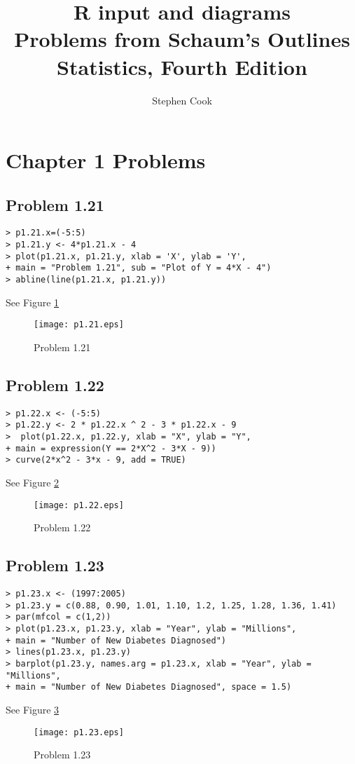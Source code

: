 \documentclass{article}
\title{R input and diagrams\\
Problems from Schaum's Outlines Statistics, Fourth Edition}
\author{Stephen Cook}
\begin{document}
\maketitle
\tableofcontents
\listoffigures

\newpage

\section{Chapter 1 Problems}
\subsection{Problem 1.21}
\begin{verbatim}
> p1.21.x=(-5:5)
> p1.21.y <- 4*p1.21.x - 4
> plot(p1.21.x, p1.21.y, xlab = 'X', ylab = 'Y', 
+ main = "Problem 1.21", sub = "Plot of Y = 4*X - 4")
> abline(line(p1.21.x, p1.21.y))
\end{verbatim}
	See Figure \ref{p1.21}
	\begin{figure}[!htb]
	  \centering
	  \texttt{[image: p1.21.eps]}
	  \caption{Problem 1.21 \label{p1.21}}
	\end{figure}

\subsection{Problem 1.22}
\begin{verbatim}
> p1.22.x <- (-5:5)
> p1.22.y <- 2 * p1.22.x ^ 2 - 3 * p1.22.x - 9
>  plot(p1.22.x, p1.22.y, xlab = "X", ylab = "Y",
+ main = expression(Y == 2*X^2 - 3*X - 9))
> curve(2*x^2 - 3*x - 9, add = TRUE)
\end{verbatim}
	See Figure \ref{p1.22}
	\begin{figure}[!htb]
	  \centering
	  \texttt{[image: p1.22.eps]}
	  \caption{Problem 1.22 \label{p1.22}}
	\end{figure}

\subsection{Problem 1.23}
\begin{verbatim}
> p1.23.x <- (1997:2005)
> p1.23.y = c(0.88, 0.90, 1.01, 1.10, 1.2, 1.25, 1.28, 1.36, 1.41)
> par(mfcol = c(1,2))
> plot(p1.23.x, p1.23.y, xlab = "Year", ylab = "Millions",
+ main = "Number of New Diabetes Diagnosed")
> lines(p1.23.x, p1.23.y)
> barplot(p1.23.y, names.arg = p1.23.x, xlab = "Year", ylab = "Millions",
+ main = "Number of New Diabetes Diagnosed", space = 1.5)
\end{verbatim}
	See Figure \ref{p1.23}
	\begin{figure}[!htb]
	  \centering
	  \texttt{[image: p1.23.eps]}
	  \caption{Problem 1.23 \label{p1.23}}
	\end{figure}
\end{document}
